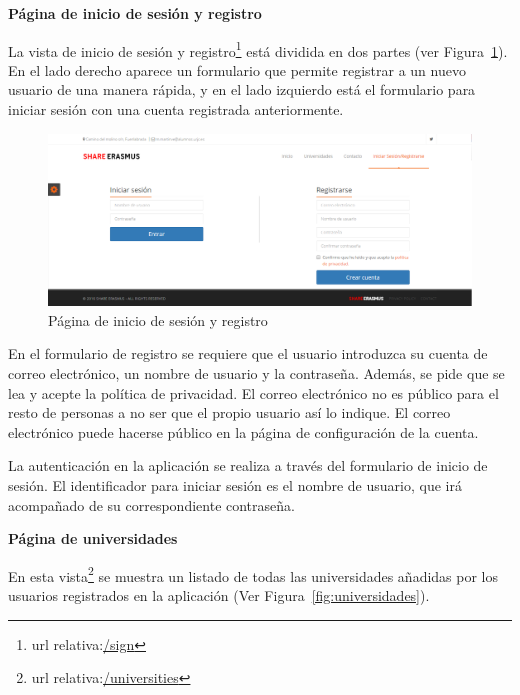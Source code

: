 \documentclass[a4paper, 12pt]{book}
\begin{document}
{\large  \textbf{Página de inicio de sesión y registro}\par}

La vista de inicio de sesión y registro\footnote{url relativa:\url{/sign}} está dividida en dos partes (ver Figura~\ref{fig:inicio-sesion-registro}). En el lado derecho aparece un formulario que permite registrar a un nuevo usuario de una manera rápida, y en el lado izquierdo está el formulario para iniciar sesión con una cuenta registrada anteriormente.
\newline

\begin{figure}[H]
  \centering
  \includegraphics[width=16cm, keepaspectratio]{img/inicio-sesion-registro.png}
  \caption{Página de inicio de sesión y registro}
  \label{fig:inicio-sesion-registro}
\end{figure}

En el formulario de registro se requiere que el usuario introduzca su cuenta de correo electrónico, un nombre de usuario y la contraseña. Además, se pide que se lea y acepte la política de privacidad. El correo electrónico no es público para el resto de personas a no ser que el propio usuario así lo indique. El correo electrónico puede hacerse público en la página de configuración de la cuenta.
\newline

La autenticación en la aplicación se realiza a través del formulario de inicio de sesión. El identificador para iniciar sesión es el nombre de usuario, que irá acompañado de su correspondiente contraseña. 
\newline

{\large  \textbf{Página de universidades}\par}

En esta vista\footnote{url relativa:\url{/universities}} se muestra un listado de todas las universidades añadidas por los usuarios registrados en la aplicación (Ver Figura~\ref{fig:universidades}).
\newline
\end{document}

